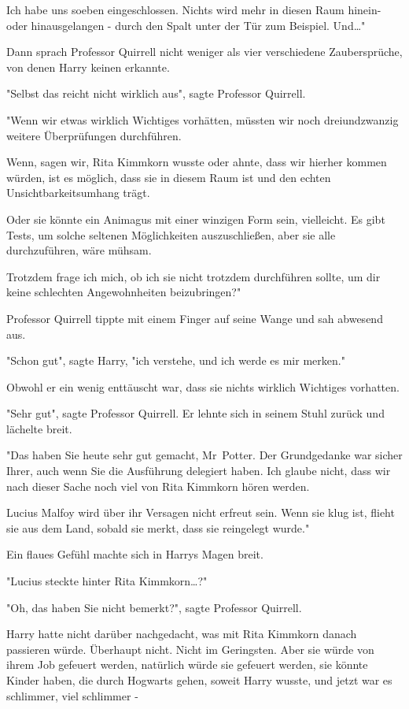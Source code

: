 {Ich habe uns soeben eingeschlossen. Nichts wird mehr in diesen Raum hinein- oder hinausgelangen - durch den Spalt unter der Tür zum Beispiel. Und…"

Dann sprach Professor Quirrell nicht weniger als vier verschiedene Zaubersprüche, von denen Harry keinen erkannte.

"Selbst das reicht nicht wirklich aus", sagte Professor Quirrell.

"Wenn wir etwas wirklich Wichtiges vorhätten, müssten wir noch dreiundzwanzig weitere Überprüfungen durchführen.

Wenn, sagen wir, Rita Kimmkorn wusste oder ahnte, dass wir hierher kommen würden, ist es möglich, dass sie in diesem Raum ist und den echten Unsichtbarkeitsumhang trägt.

Oder sie könnte ein Animagus mit einer winzigen Form sein, vielleicht. Es gibt Tests, um solche seltenen Möglichkeiten auszuschließen, aber sie alle durchzuführen, wäre mühsam.

Trotzdem frage ich mich, ob ich sie nicht trotzdem durchführen sollte, um dir keine schlechten Angewohnheiten beizubringen?"

Professor Quirrell tippte mit einem Finger auf seine Wange und sah abwesend aus.

"Schon gut", sagte Harry, "ich verstehe, und ich werde es mir merken."

Obwohl er ein wenig enttäuscht war, dass sie nichts wirklich Wichtiges vorhatten.

"Sehr gut", sagte Professor Quirrell. Er lehnte sich in seinem Stuhl zurück und lächelte breit.

"Das haben Sie heute sehr gut gemacht, Mr~Potter. Der Grundgedanke war sicher Ihrer, auch wenn Sie die Ausführung delegiert haben. Ich glaube nicht, dass wir nach dieser Sache noch viel von Rita Kimmkorn hören werden.

Lucius Malfoy wird über ihr Versagen nicht erfreut sein. Wenn sie klug ist, flieht sie aus dem Land, sobald sie merkt, dass sie reingelegt wurde."

Ein flaues Gefühl machte sich in Harrys Magen breit.

"Lucius steckte hinter Rita Kimmkorn…?"

"Oh, das haben Sie nicht bemerkt?", sagte Professor Quirrell.

Harry hatte nicht darüber nachgedacht, was mit Rita Kimmkorn danach passieren würde. Überhaupt nicht. Nicht im Geringsten. Aber sie würde von ihrem Job gefeuert werden, natürlich würde sie gefeuert werden, sie könnte Kinder haben, die durch Hogwarts gehen, soweit Harry wusste, und jetzt war es schlimmer, viel schlimmer -

}
